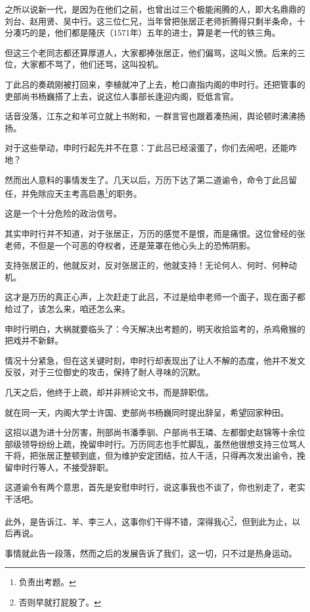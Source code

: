 \begin{multicols}{\theparacolNo}
之所以说新一代，是因为在他们之前，也曾出过三个极能闹腾的人，即大名鼎鼎的刘台、赵用贤、吴中行。这三位仁兄，当年曾把张居正老师折腾得只剩半条命，十分凑巧的是，他们都是隆庆（1571年）五年的进士，算是老一代的铁三角。

但这三个老同志都还算厚道人，大家都捧张居正，他们偏骂，这叫义愤。后来的三位，大家都不骂了，他们还骂，这叫投机。

丁此吕的奏疏刚被打回来，李植就冲了上去，枪口直指内阁的申时行。还把管事的吏部尚书杨巍搭了上去，说这位人事部长逢迎内阁，贬低言官。

话音没落，江东之和羊可立就上书附和，一群言官也跟着凑热闹，舆论顿时沸沸扬扬。

对于这些举动，申时行起先并不在意：丁此吕已经滚蛋了，你们去闹吧，还能咋地？

然而出人意料的事情发生了。几天以后，万历下达了第二道谕令，命令丁此吕留任，并免除应天主考高启愚\footnote{负责出考题。}的职务。

这是一个十分危险的政治信号。

其实申时行并不知道，对于张居正，万历的感觉不是恨，而是痛恨。这位曾经的张老师，不但是一个可恶的夺权者，还是笼罩在他心头上的恐怖阴影。

支持张居正的，他就反对，反对张居正的，他就支持！无论何人、何时、何种动机。

这才是万历的真正心声，上次赶走丁此吕，不过是给申老师一个面子，现在面子都给过了，该怎么来，咱还怎么来。

申时行明白，大祸就要临头了：今天解决出考题的，明天收拾监考的，杀鸡儆猴的把戏并不新鲜。

情况十分紧急，但在这关键时刻，申时行却表现出了让人不解的态度，他并不发文反驳，对于三位御史的攻击，保持了耐人寻味的沉默。

几天之后，他终于上疏，却并非辨论文书，而是辞职信。

就在同一天，内阁大学士许国、吏部尚书杨巍同时提出辞呈，希望回家种田。

这招以退为进十分厉害，刑部尚书潘季驯、户部尚书王璘、左都御史赵锦等十余位部级领导纷纷上疏，挽留申时行。万历同志也手忙脚乱，虽然他很想支持三位骂人干将，把张居正整顿到底，但为维护安定团结，拉人干活，只得再次发出谕令，挽留申时行等人，不接受辞职。

这道谕令有两个意思，首先是安慰申时行，说这事我也不谈了，你也别走了，老实干活吧。

此外，是告诉江、羊、李三人，这事你们干得不错，深得我心\footnote{否则早就打屁股了。}，但到此为止，以后再说。

事情就此告一段落，然而之后的发展告诉了我们，这一切，只不过是热身运动。


\end{multicols}
